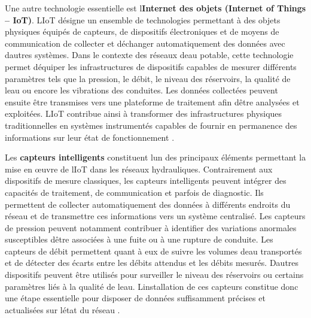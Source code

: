 \documentclass[12pt,a4paper,oneside]{report}
\begin{document}
Une autre technologie essentielle est
l\textquotesingle{}\textbf{Internet des objets (Internet of Things --
IoT)}. L\textquotesingle IoT désigne un ensemble de technologies
permettant à des objets physiques équipés de capteurs, de dispositifs
électroniques et de moyens de communication de collecter et
d\textquotesingle échanger automatiquement des données avec
d\textquotesingle autres systèmes. Dans le contexte des réseaux
d\textquotesingle eau potable, cette technologie permet
d\textquotesingle équiper les infrastructures de dispositifs capables de
mesurer différents paramètres tels que la pression, le débit, le niveau
des réservoirs, la qualité de l\textquotesingle eau ou encore les
vibrations des conduites. Les données collectées peuvent ensuite être
transmises vers une plateforme de traitement afin d\textquotesingle être
analysées et exploitées. L\textquotesingle IoT contribue ainsi à
transformer des infrastructures physiques traditionnelles en systèmes
instrumentés capables de fournir en permanence des informations sur leur
état de fonctionnement \cite{ref20}.

Les \textbf{capteurs intelligents} constituent l\textquotesingle un des
principaux éléments permettant la mise en œuvre de l\textquotesingle IoT
dans les réseaux hydrauliques. Contrairement aux dispositifs de mesure
classiques, les capteurs intelligents peuvent intégrer des capacités de
traitement, de communication et parfois de diagnostic. Ils permettent de
collecter automatiquement des données à différents endroits du réseau et
de transmettre ces informations vers un système centralisé. Les capteurs
de pression peuvent notamment contribuer à identifier des variations
anormales susceptibles d\textquotesingle être associées à une fuite ou à
une rupture de conduite. Les capteurs de débit permettent quant à eux de
suivre les volumes d\textquotesingle eau transportés et de détecter des
écarts entre les débits attendus et les débits mesurés.
D\textquotesingle autres dispositifs peuvent être utilisés pour
surveiller le niveau des réservoirs ou certains paramètres liés à la
qualité de l\textquotesingle eau. L\textquotesingle installation de ces
capteurs constitue donc une étape essentielle pour disposer de données
suffisamment précises et actualisées sur l\textquotesingle état du
réseau \cite{ref47}.
\end{document}
